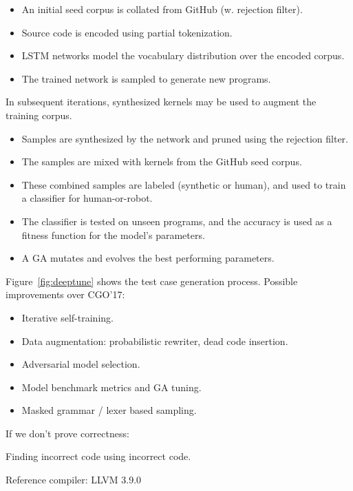 \begin{itemize}
\item An initial seed corpus is collated from GitHub (w. rejection filter).
\item Source code is encoded using partial tokenization.
\item LSTM networks model the vocabulary distribution over the encoded corpus.
\item The trained network is sampled to generate new programs.
\end{itemize}

In subsequent iterations, synthesized kernels may be used to augment the training corpus.

\begin{itemize}
\item Samples are synthesized by the network and pruned using the rejection filter.
\item The samples are mixed with kernels from the GitHub seed corpus.
\item These combined samples are labeled (synthetic or human), and used to train a classifier for human-or-robot.
\item The classifier is tested on unseen programs, and the accuracy is used as a fitness function for the model's parameters.
\item A GA mutates and evolves the best performing parameters.
\end{itemize}

Figure~\ref{fig:deeptune} shows the test case generation process. Possible improvements over CGO'17:

\begin{itemize}
        \item Iterative self-training.
        \item Data augmentation: probabilistic rewriter, dead code insertion.
        \item Adversarial model selection.
        \item Model benchmark metrics and GA tuning.
        \item Masked grammar / lexer based sampling.
\end{itemize}

\noindent If we don't prove correctness:

Finding incorrect code using incorrect code.

Reference compiler: LLVM 3.9.0


